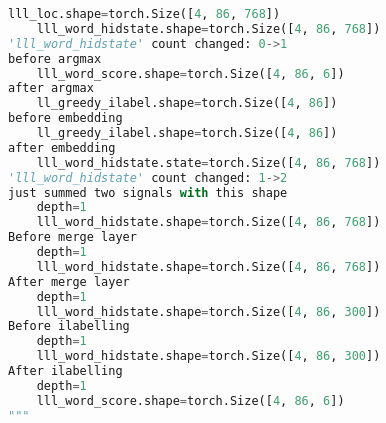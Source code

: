 \documentclass[12pt]{article}
\begin{document}
\begin{lstlisting}[language=Python]
    lll_loc.shape=torch.Size([4, 86, 768])
    lll_word_hidstate.shape=torch.Size([4, 86, 768])
'lll_word_hidstate' count changed: 0->1
before argmax
    lll_word_score.shape=torch.Size([4, 86, 6])
after argmax
    ll_greedy_ilabel.shape=torch.Size([4, 86])
before embedding
    ll_greedy_ilabel.shape=torch.Size([4, 86])
after embedding
    lll_word_hidstate.state=torch.Size([4, 86, 768])
'lll_word_hidstate' count changed: 1->2
just summed two signals with this shape
    depth=1
    lll_word_hidstate.shape=torch.Size([4, 86, 768])
Before merge layer
    depth=1
    lll_word_hidstate.shape=torch.Size([4, 86, 768])
After merge layer
    depth=1
    lll_word_hidstate.shape=torch.Size([4, 86, 300])
Before ilabelling
    depth=1
    lll_word_hidstate.shape=torch.Size([4, 86, 300])
After ilabelling
    depth=1
    lll_word_score.shape=torch.Size([4, 86, 6])
"""
\end{lstlisting}








\end{document}
